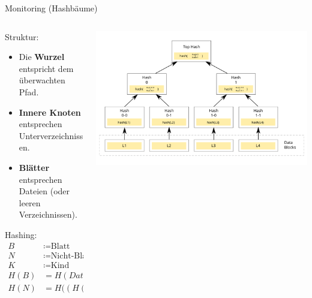 \documentclass[
    ngerman,%
    authorontitle=true,
]{bfhbeamer}
\begin{document}
    \begin{frame}{Monitoring (Hashb\"aume)}
        \begin{columns}
            \begin{column}{0.5\textwidth}
                \item Struktur:
                \begin{itemize}
                    \item Die \textbf{Wurzel} entspricht dem überwachten Pfad.
                    \item \textbf{Innere Knoten} entsprechen Unterverzeichnissen.
                    \item \textbf{Blätter} entsprechen Dateien (oder leeren Verzeichnissen).
                \end{itemize}
                \item Hashing:
                \begin{align*}
                    B &\coloneqq \text{Blatt} \\
                    N &\coloneqq \text{Nicht-Blatt} \\
                    K &\coloneqq \text{Kind} \\
                    H(B) &= H(Datei)\\
                    H(N) &= H((H(K_1) \|H(K_2) \| \dots \|H(K_k))\\
                \end{align*}
            \end{column}
            \begin{column}{0.5\textwidth}
                \begin{center}
                    \includegraphics[width=1\textwidth]{assets/presentation/hashtree}
                \end{center}
            \end{column}
        \end{columns}
    \end{frame}
\end{document}

